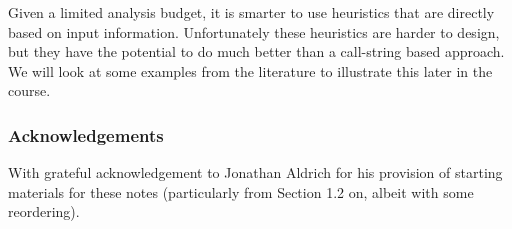 \documentclass[11pt]{article}
\begin{document}
Given a limited analysis budget, it is smarter to use heuristics that are directly based on input information.  Unfortunately these heuristics are harder to design, but they have the potential to do much better than a call-string based approach.  We will look at some examples from the literature to illustrate this later in the course.

\subsubsection*{Acknowledgements}

With grateful acknowledgement to Jonathan Aldrich for his provision of starting
materials for these notes (particularly from Section 1.2 on, albeit with some reordering).
\end{document}
